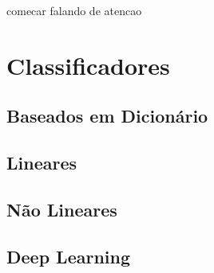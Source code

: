 comecar falando de atencao


\section{Classificadores}
\subsection{Baseados em Dicionário} \label{sec:dictionary}
\subsection{Lineares}
\subsection{Não Lineares}
\subsection{Deep Learning}

